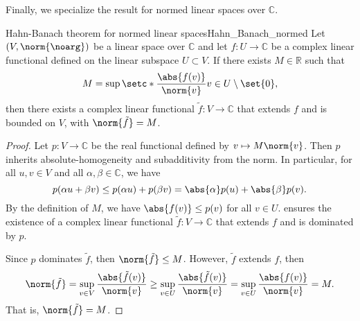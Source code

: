 Finally, we specialize the result for normed linear spaces over \(\mathbb{C}\).
\begin{theorem}{Hahn-Banach theorem for normed linear spaces}{Hahn_Banach_normed}
    Let \((V, \norm{\noarg})\) be a linear space over \(\mathbb{C}\) and let \(f : U \to \mathbb{C}\) be a complex linear functional defined on the linear subspace \(U\subset V\). If there exists \(M \in \mathbb{R}\) such that
    \begin{equation*}
        M = \sup \setc*{\frac{\abs{f(v)}}{\norm{v}}}{v \in U\setminus \set{0}},
    \end{equation*}
    then there exists a complex linear functional \(\tilde{f} : V \to \mathbb{C}\) that extends \(f\) and is bounded on \(V\), with \(\norm{\tilde{f}} = M\).
\end{theorem}
\begin{proof}
    Let \(p : V \to \mathbb{C}\) be the real functional defined by \(v \mapsto M \norm{v}\). Then \(p\) inherits absolute-homogeneity and subadditivity from the norm. In particular, for all \(u, v \in V\) and all \(\alpha, \beta \in \mathbb{C}\), we have
    \begin{equation*}
        p(\alpha u + \beta v) \leq p(\alpha u) + p(\beta v) = \abs{\alpha} p(u) + \abs{\beta}p(v).
    \end{equation*}
    By the definition of \(M\), we have \(\abs{f(v)} \leq p(v)\) for all \(v \in U\).  ensures the existence of a complex linear functional \(\tilde{f} : V \to \mathbb{C}\) that extends \(f\) and is dominated by \(p\).

    Since \(p\) dominates \(\tilde{f}\), then \(\norm{\tilde{f}} \leq M\). However, \(\tilde{f}\) extends \(f\), then
    \begin{equation*}
        \norm{\tilde{f}} = \sup_{v \in V}{\frac{\abs{\tilde{f}(v)}}{\norm{v}}} \geq \sup_{v \in U} \frac{\abs{\tilde{f}(v)}}{\norm{v}} = \sup_{v \in U} \frac{\abs{f(v)}}{\norm{v}} = M.
    \end{equation*}
    That is, \(\norm{\tilde{f}} = M\).
\end{proof}

